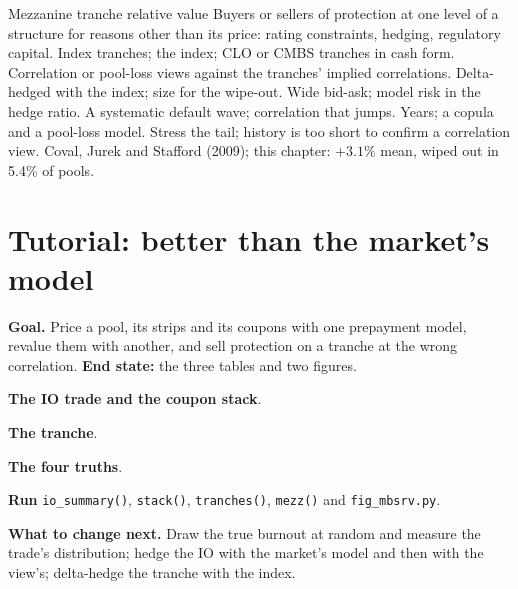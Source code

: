 \begin{strategyfile}{Mezzanine tranche relative value}\label{strat:s2:mortgage-and-structured-credit-strategies:mezz}
 Buyers or sellers of protection at one level of a structure for reasons other than its price: rating constraints,
hedging, regulatory capital.
 Index tranches; the index; CLO or CMBS tranches in cash form.
 Correlation or pool-loss views against the tranches' implied correlations.
 Delta-hedged with the index; size for the wipe-out.
 Wide bid-ask; model risk in the hedge ratio.
 A systematic default wave; correlation that jumps.
 Years; a copula and a pool-loss model.
 Stress the tail; history is too short to confirm a correlation view.
 Coval, Jurek and Stafford (2009); this chapter: $+3.1\%$ mean, wiped out in 5.4\% of pools.
\end{strategyfile}

\section{Tutorial: better than the market's model}\label{tut:s2:mortgage-and-structured-credit-strategies:tut}

\begin{tutorial}
\textbf{Goal.} Price a pool, its strips and its coupons with one prepayment model, revalue them with another, and sell protection on a tranche at the
wrong correlation. \textbf{End state:} the three tables and two figures.
\begin{tutsteps}
\item \textbf{The IO trade and the coupon stack}.
\label{lst:s2:mortgage-and-structured-credit-strategies:io}
\item \textbf{The tranche}.
\label{lst:s2:mortgage-and-structured-credit-strategies:tranche}
\item \textbf{The four truths}.
\label{lst:s2:mortgage-and-structured-credit-strategies:truths}
\item \textbf{Run} \texttt{io\_summary()}, \texttt{stack()}, \texttt{tranches()}, \texttt{mezz()} and \texttt{fig\_mbsrv.py}.
\end{tutsteps}
\textbf{What to change next.} Draw the true burnout at random and measure the trade's distribution; hedge the IO with the market's model and then
with the view's; delta-hedge the tranche with the index.
\end{tutorial}

